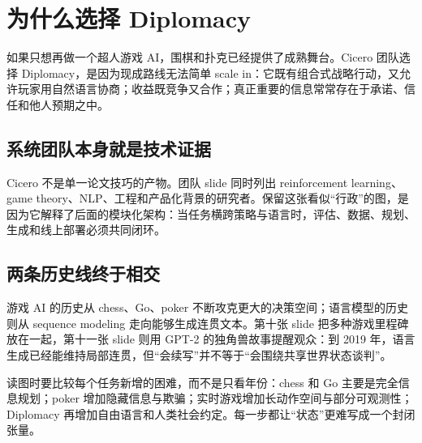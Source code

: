 \section{为什么选择 Diplomacy}

如果只想再做一个超人游戏 AI，围棋和扑克已经提供了成熟舞台。Cicero 团队选择 Diplomacy，是因为现成路线无法简单 scale in：它既有组合式战略行动，又允许玩家用自然语言协商；收益既竞争又合作；真正重要的信息常常存在于承诺、信任和他人预期之中。

\subsection{系统团队本身就是技术证据}

Cicero 不是单一论文技巧的产物。团队 slide 同时列出 reinforcement learning、game theory、NLP、工程和产品化背景的研究者。保留这张看似“行政”的图，是因为它解释了后面的模块化架构：当任务横跨策略与语言时，评估、数据、规划、生成和线上部署必须共同闭环。



\subsection{两条历史线终于相交}

游戏 AI 的历史从 chess、Go、poker 不断攻克更大的决策空间；语言模型的历史则从 sequence modeling 走向能够生成连贯文本。第十张 slide 把多种游戏里程碑放在一起，第十一张 slide 则用 GPT-2 的独角兽故事提醒观众：到 2019 年，语言生成已经能维持局部连贯，但“会续写”并不等于“会围绕共享世界状态谈判”。


读图时要比较每个任务新增的困难，而不是只看年份：chess 和 Go 主要是完全信息规划；poker 增加隐藏信息与欺骗；实时游戏增加长动作空间与部分可观测性；Diplomacy 再增加自由语言和人类社会约定。每一步都让“状态”更难写成一个封闭张量。


